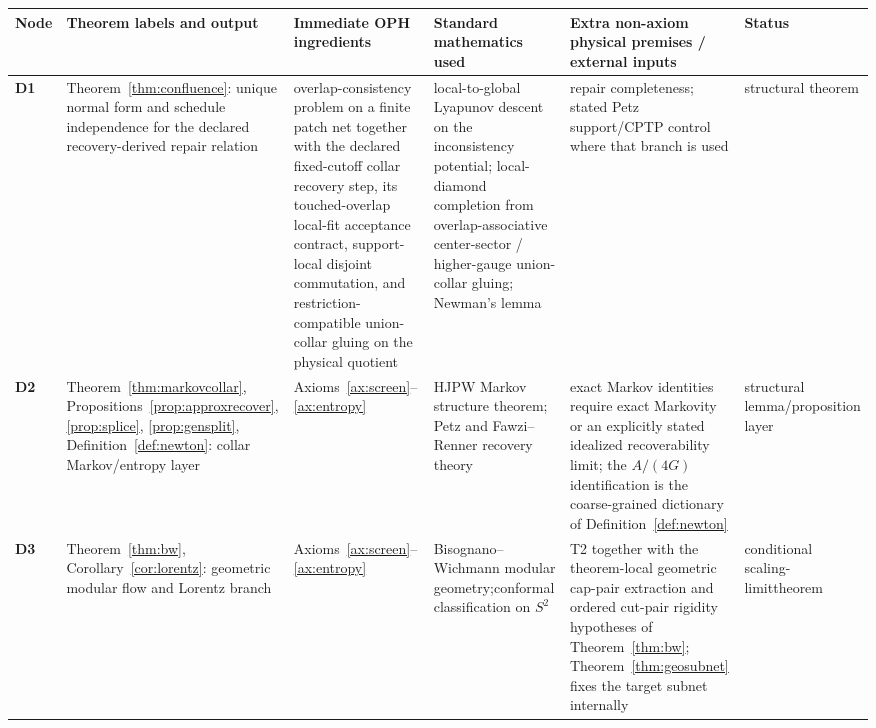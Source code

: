 \documentclass[11pt]{article}
\begin{document}
\begingroup
\scriptsize
\setlength{\tabcolsep}{1pt}
\begin{longtable}{@{}>{\raggedright\arraybackslash}p{}>{\raggedright\arraybackslash}p{}>{\raggedright\arraybackslash}p{}>{\raggedright\arraybackslash}p{}>{\raggedright\arraybackslash}p{}>{\raggedright\arraybackslash}p{}@{}}
\toprule
Node & Theorem labels and output & Immediate OPH ingredients & Standard mathematics used & Extra non-axiom physical premises / external inputs & Status \\
\midrule
\endhead
\bottomrule
\endfoot
\textbf{D1} & Theorem~\ref{thm:confluence}: unique normal form and schedule independence for the declared recovery-derived repair relation & overlap-consistency problem on a finite patch net together with the declared fixed-cutoff collar recovery step, its touched-overlap local-fit acceptance contract, support-local disjoint commutation, and restriction-compatible union-collar gluing on the physical quotient & local-to-global Lyapunov descent on the inconsistency potential; local-diamond completion from overlap-associative center-sector / higher-gauge union-collar gluing; Newman's lemma & repair completeness; stated Petz support/CPTP control where that branch is used & structural theorem \\
\textbf{D2} & Theorem~\ref{thm:markovcollar}, Propositions~\ref{prop:approxrecover}, \ref{prop:splice}, \ref{prop:gensplit}, Definition~\ref{def:newton}: collar Markov/entropy layer & Axioms~\ref{ax:screen}--\ref{ax:entropy} & HJPW Markov structure theorem; Petz and Fawzi--Renner recovery theory & exact Markov identities require exact Markovity or an explicitly stated idealized recoverability limit; the \(A/(4G)\) identification is the coarse-grained dictionary of Definition~\ref{def:newton} & structural lemma/\newline proposition layer \\
\textbf{D3} & Theorem~\ref{thm:bw}, Corollary~\ref{cor:lorentz}: geometric modular flow and Lorentz branch & Axioms~\ref{ax:screen}--\ref{ax:entropy} & Bisognano--Wichmann modular geometry;\newline conformal classification on \(S^2\) & T2 together with the theorem-local geometric cap-pair extraction and ordered cut-pair rigidity hypotheses of Theorem~\ref{thm:bw}; Theorem~\ref{thm:geosubnet} fixes the target subnet internally & conditional scaling-limit\newline theorem \\

\end{longtable}
\end{document}
